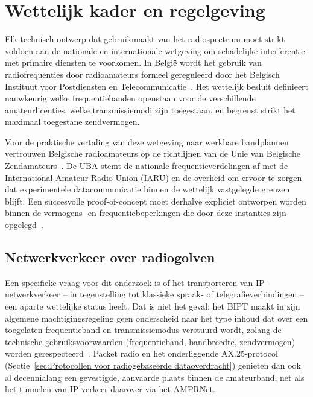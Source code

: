\section{Wettelijk kader en regelgeving}
\label{sec:Wettelijk kader en regelgeving}

Elk technisch ontwerp dat gebruikmaakt van het radiospectrum moet strikt voldoen aan de nationale
en internationale wetgeving om schadelijke interferentie met primaire diensten te voorkomen. In
België wordt het gebruik van radiofrequenties door radioamateurs formeel gereguleerd door het
Belgisch Instituut voor Postdiensten en Telecommunicatie~\autocite{BIPT2019}. Het wettelijk besluit
definieert nauwkeurig welke frequentiebanden openstaan voor de verschillende amateurlicenties,
welke transmissiemodi zijn toegestaan, en begrenst strikt het maximaal toegestane zendvermogen.

Voor de praktische vertaling van deze wetgeving naar werkbare bandplannen vertrouwen Belgische
radioamateurs op de richtlijnen van de Unie van Belgische Zendamateurs~\autocite{UBAFrequenties}.
De UBA stemt de nationale frequentieverdelingen af met de International Amateur Radio Union (IARU)
en de overheid om ervoor te zorgen dat experimentele datacommunicatie binnen de wettelijk
vastgelegde grenzen blijft. Een succesvolle proof-of-concept moet derhalve expliciet ontworpen worden
binnen de vermogens- en frequentiebeperkingen die door deze instanties zijn opgelegd~\autocite{BIPT2019, UBAFrequenties}.

\subsection{Netwerkverkeer over radiogolven}%
\label{subsec:netwerkverkeer-radio}

Een specifieke vraag voor dit onderzoek is of het transporteren van IP-netwerkverkeer --
in tegenstelling tot klassieke spraak- of telegrafieverbindingen -- een aparte
wettelijke status heeft. Dat is niet het geval: het BIPT maakt in zijn algemene
machtigingsregeling geen onderscheid naar het type inhoud dat over een toegelaten
frequentieband en transmissiemodus verstuurd wordt, zolang de technische
gebruiksvoorwaarden (frequentieband, bandbreedte, zendvermogen) worden
gerespecteerd~\autocite{BIPT2019}. Packet radio en het onderliggende AX.25-protocol
(Sectie~\ref{sec:Protocollen voor radiogebaseerde dataoverdracht}) genieten dan ook al
decennialang een gevestigde, aanvaarde plaats binnen de amateurband, net als het
tunnelen van IP-verkeer daarover via het AMPRNet.

